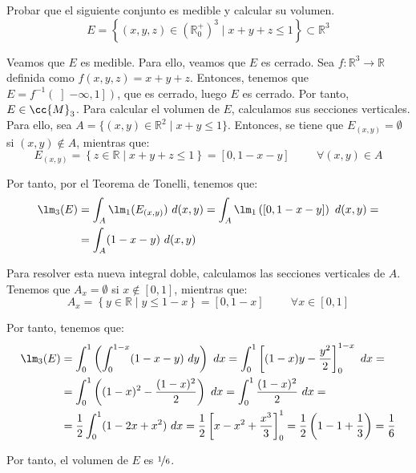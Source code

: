 \begin{ejercicio}
    Probar que el siguiente conjunto es medible y calcular su volumen.
    \[ E = \left\{ (x, y, z) \in \left(\mathbb{R}^+_0\right)^3 \mid x + y + z \leq 1 \right\} \subset \mathbb{R}^3 \]

    Veamos que $E$ es medible. Para ello, veamos que $E$ es cerrado. Sea $f:\mathbb{R}^3\to\mathbb{R}$ definida como $f(x,y,z)=x+y+z$.
    Entonces, tenemos que $E=f^{-1}\left(\left]-\infty,1\right]\right)$, que es cerrado, luego $E$ es cerrado. Por tanto, $E\in \cc{M}_3$.
    Para calcular el volumen de $E$, calculamos sus secciones verticales. Para ello, sea $A=\{(x,y)\in \mathbb{R}^2 \mid x+y\leq 1\}$. Entonces,
    se tiene que $E_{(x,y)}=\emptyset$ si $(x,y)\notin A$, mientras que:
    \begin{equation*}
        E_{(x,y)} = \left\{ z\in \mathbb{R} \mid x+y+z\leq 1 \right\} = \left[ 0, 1-x-y \right] \hspace{1cm} \forall (x,y)\in A
    \end{equation*}

    Por tanto, por el Teorema de Tonelli, tenemos que:
    \begin{align*}
        \lm_3(E) &= \int_A \lm_1(E_{(x,y)})~d(x,y)
        = \int_A \lm_1\left( \left[ 0, 1-x-y \right] \right)~d(x,y) =\\
        &= \int_A (1-x-y)~d(x,y)
    \end{align*}

    Para resolver esta nueva integral doble, calculamos las secciones verticales de $A$. Tenemos que
    $A_x=\emptyset$ si $x\notin \left[0,1\right]$, mientras que:
    \begin{equation*}
        A_x = \left\{ y\in \mathbb{R} \mid y\leq 1-x \right\} = \left[ 0, 1-x \right] \hspace{1cm} \forall x\in \left[0,1\right]
    \end{equation*}

    Por tanto, tenemos que:
    \begin{align*}
        \lm_3(E) &= \int_{0}^{1} \left( \int_{0}^{1-x} (1-x-y)~dy \right)~dx
        = \int_{0}^{1} \left[ (1-x)y -\dfrac{y^2}{2} \right]_{0}^{1-x}~dx =\\
        &= \int_{0}^{1} \left( (1-x)^2-\dfrac{(1-x)^2}{2} \right)~dx
        = \int_{0}^{1}\dfrac{(1-x)^2}{2}~dx =\\
        &= \dfrac{1}{2}\int_{0}^{1} (1-2x+x^2)~dx
        = \dfrac{1}{2}\left[ x-x^2+\dfrac{x^3}{3} \right]_{0}^{1} = \dfrac{1}{2}\left( 1-1+\dfrac{1}{3} \right) = \dfrac{1}{6}
    \end{align*}

    Por tanto, el volumen de $E$ es $\nicefrac{1}{6}$.
\end{ejercicio}
    
